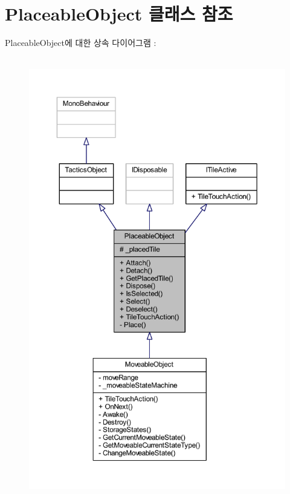 \hypertarget{class_placeable_object}{}\section{Placeable\+Object 클래스 참조}
\label{class_placeable_object}


Placeable\+Object에 대한 상속 다이어그램 \+: \nopagebreak
\begin{figure}[H]
\begin{center}
\leavevmode
\includegraphics[height=550pt]{class_placeable_object__inherit__graph}
\end{center}
\end{figure}


